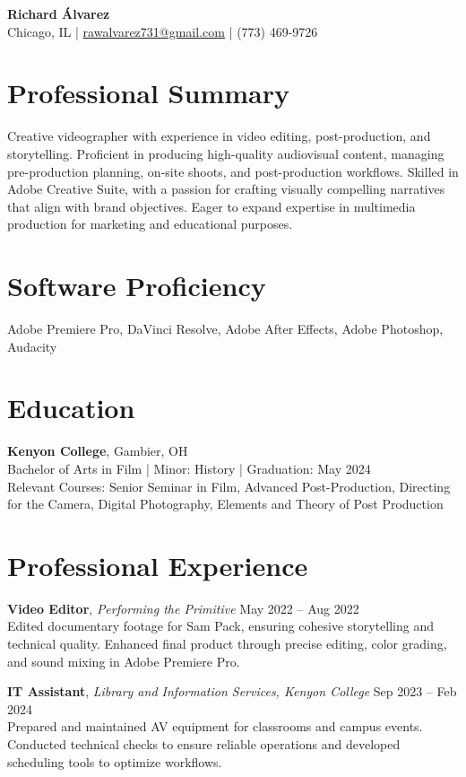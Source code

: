 \documentclass[letterpaper,11pt]{article}
\begin{document}
\begin{center}
    {\LARGE \textbf{Richard Álvarez}}\\[0.8em]
    Chicago, IL | \href{mailto:rawalvarez731@gmail.com}{rawalvarez731@gmail.com} | (773) 469-9726
\end{center}

\section*{Professional Summary}
Creative videographer with experience in video editing, post-production, and storytelling. Proficient in producing high-quality audiovisual content, managing pre-production planning, on-site shoots, and post-production workflows. Skilled in Adobe Creative Suite, with a passion for crafting visually compelling narratives that align with brand objectives. Eager to expand expertise in multimedia production for marketing and educational purposes.

\section*{Software Proficiency}
Adobe Premiere Pro, DaVinci Resolve, Adobe After Effects, Adobe Photoshop, Audacity

\section*{Education}
\textbf{Kenyon College}, Gambier, OH\\
Bachelor of Arts in Film | Minor: History | Graduation: May 2024\\
Relevant Courses: Senior Seminar in Film, Advanced Post-Production, Directing for the Camera, Digital Photography, Elements and Theory of Post Production

\section*{Professional Experience}
\textbf{Video Editor}, \textit{Performing the Primitive} \hfill May 2022 -- Aug 2022 \\
Edited documentary footage for Sam Pack, ensuring cohesive storytelling and technical quality. Enhanced final product through precise editing, color grading, and sound mixing in Adobe Premiere Pro.

\textbf{IT Assistant}, \textit{Library and Information Services, Kenyon College} \hfill Sep 2023 -- Feb 2024\\
Prepared and maintained AV equipment for classrooms and campus events. Conducted technical checks to ensure reliable operations and developed scheduling tools to optimize workflows.
\end{document}
